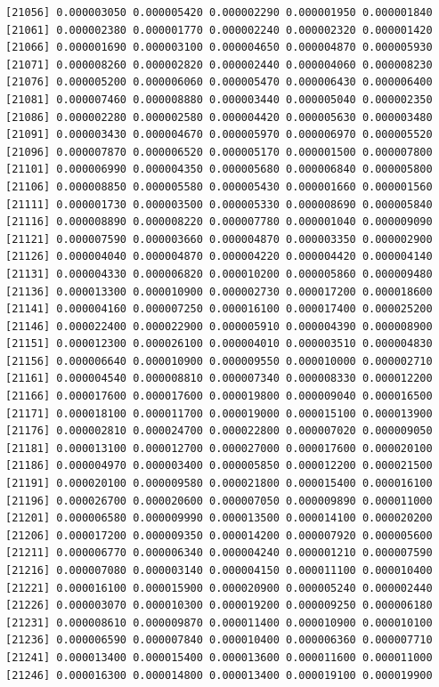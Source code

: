 \documentclass[]{article}
\begin{document}
\begin{verbatim}
[21056] 0.000003050 0.000005420 0.000002290 0.000001950 0.000001840
[21061] 0.000002380 0.000001770 0.000002240 0.000002320 0.000001420
[21066] 0.000001690 0.000003100 0.000004650 0.000004870 0.000005930
[21071] 0.000008260 0.000002820 0.000002440 0.000004060 0.000008230
[21076] 0.000005200 0.000006060 0.000005470 0.000006430 0.000006400
[21081] 0.000007460 0.000008880 0.000003440 0.000005040 0.000002350
[21086] 0.000002280 0.000002580 0.000004420 0.000005630 0.000003480
[21091] 0.000003430 0.000004670 0.000005970 0.000006970 0.000005520
[21096] 0.000007870 0.000006520 0.000005170 0.000001500 0.000007800
[21101] 0.000006990 0.000004350 0.000005680 0.000006840 0.000005800
[21106] 0.000008850 0.000005580 0.000005430 0.000001660 0.000001560
[21111] 0.000001730 0.000003500 0.000005330 0.000008690 0.000005840
[21116] 0.000008890 0.000008220 0.000007780 0.000001040 0.000009090
[21121] 0.000007590 0.000003660 0.000004870 0.000003350 0.000002900
[21126] 0.000004040 0.000004870 0.000004220 0.000004420 0.000004140
[21131] 0.000004330 0.000006820 0.000010200 0.000005860 0.000009480
[21136] 0.000013300 0.000010900 0.000002730 0.000017200 0.000018600
[21141] 0.000004160 0.000007250 0.000016100 0.000017400 0.000025200
[21146] 0.000022400 0.000022900 0.000005910 0.000004390 0.000008900
[21151] 0.000012300 0.000026100 0.000004010 0.000003510 0.000004830
[21156] 0.000006640 0.000010900 0.000009550 0.000010000 0.000002710
[21161] 0.000004540 0.000008810 0.000007340 0.000008330 0.000012200
[21166] 0.000017600 0.000017600 0.000019800 0.000009040 0.000016500
[21171] 0.000018100 0.000011700 0.000019000 0.000015100 0.000013900
[21176] 0.000002810 0.000024700 0.000022800 0.000007020 0.000009050
[21181] 0.000013100 0.000012700 0.000027000 0.000017600 0.000020100
[21186] 0.000004970 0.000003400 0.000005850 0.000012200 0.000021500
[21191] 0.000020100 0.000009580 0.000021800 0.000015400 0.000016100
[21196] 0.000026700 0.000020600 0.000007050 0.000009890 0.000011000
[21201] 0.000006580 0.000009990 0.000013500 0.000014100 0.000020200
[21206] 0.000017200 0.000009350 0.000014200 0.000007920 0.000005600
[21211] 0.000006770 0.000006340 0.000004240 0.000001210 0.000007590
[21216] 0.000007080 0.000003140 0.000004150 0.000011100 0.000010400
[21221] 0.000016100 0.000015900 0.000020900 0.000005240 0.000002440
[21226] 0.000003070 0.000010300 0.000019200 0.000009250 0.000006180
[21231] 0.000008610 0.000009870 0.000011400 0.000010900 0.000010100
[21236] 0.000006590 0.000007840 0.000010400 0.000006360 0.000007710
[21241] 0.000013400 0.000015400 0.000013600 0.000011600 0.000011000
[21246] 0.000016300 0.000014800 0.000013400 0.000019100 0.000019900

\end{verbatim}
\end{document}

